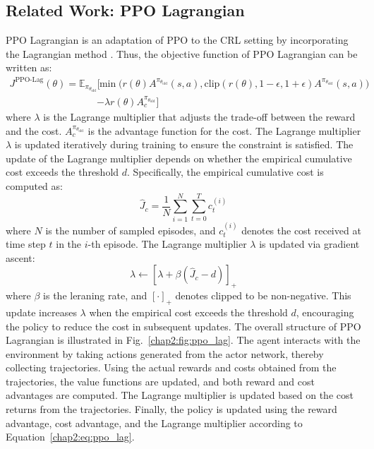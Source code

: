 \subsection{Related Work: PPO Lagrangian}

PPO Lagrangian is an adaptation of PPO to the CRL setting by incorporating the Lagrangian method \cite{PPO-Lagrangian}.
Thus, the objective function of PPO Lagrangian can be written as:
\begin{equation} \label{chap2:eq:ppo_lag}
  \begin{aligned}
    J^{\text{PPO-Lag}}(\theta) = \mathbb{E}_{\pi_{\theta_\text{old}}} \Big[ &\min \big( r(\theta) A^{\pi_{\theta_\text{old}}}(s, a), \text{clip}(r(\theta), 1 - \epsilon, 1 + \epsilon) A^{\pi_{\theta_\text{old}}}(s, a) \big) \\
    &- \lambda r(\theta) A^{\pi_{\theta_\text{old}}}_c \Big]
  \end{aligned}
\end{equation}
where $\lambda$ is the Lagrange multiplier that adjusts the trade-off between the reward and the cost.
$A^{\pi_{\theta_\text{old}}}_c$ is the advantage function for the cost.
The Lagrange multiplier $\lambda$ is updated iteratively during training to ensure the constraint is satisfied.
The update of the Lagrange multiplier depends on whether the empirical cumulative cost exceeds the threshold $d$.
Specifically, the empirical cumulative cost is computed as:
\begin{equation}
  \hat{J}_c = \frac{1}{N} \sum^N_{i = 1} \sum^T_{t = 0}  c^{(i)}_t
\end{equation}
where $N$ is the number of sampled episodes, and $c^{(i)}_t$ denotes the cost received at time step $t$ in the $i$-th episode.
The Lagrange multiplier $\lambda$ is updated via gradient ascent:
\begin{equation}
  \lambda \leftarrow \left[ \lambda + \beta\left( \hat{J}_c - d \right) \right]_+
\end{equation}
where $\beta$ is the leraning rate, and $[\cdot]_+$ denotes clipped to be non-negative.
This update increases $\lambda$ when the empirical cost exceeds the threshold $d$, encouraging the policy to reduce the cost in subsequent updates.
The overall structure of PPO Lagrangian is illustrated in Fig.~\ref{chap2:fig:ppo_lag}.
The agent interacts with the environment by taking actions generated from the actor network, thereby collecting trajectories. 
Using the actual rewards and costs obtained from the trajectories, the value functions are updated, and both reward and cost advantages are computed. 
The Lagrange multiplier is updated based on the cost returns from the trajectories. 
Finally, the policy is updated using the reward advantage, cost advantage, and the Lagrange multiplier according to Equation~\ref{chap2:eq:ppo_lag}.

